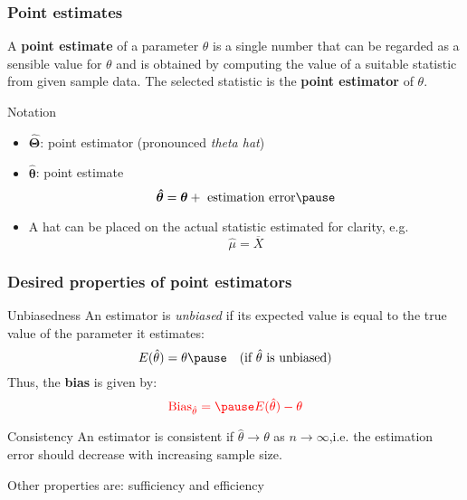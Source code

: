 \documentclass[smaller]{beamer}
\newcommand{\?}{\stackrel{?}{=}}
\newcommand{\ol}{\overline}
\newcommand{\rd}{\color{red}}
\begin{document}
\begin{frame}
  \frametitle{Point estimates}
  \begin{definition}
    A \textbf{point estimate} of a parameter $\theta$ is a single number that can be regarded as a sensible value for
    $\theta$ and is obtained by computing the value of a suitable statistic from given sample data. \pause The selected
    statistic is the \textbf{point estimator} of $\theta$.
  \end{definition}
  \pause
  \begin{block}{Notation}\pause
    \begin{itemize} 
    \item $\bm{\hat\Theta}$: point estimator (pronounced {\it theta hat}) \pause
    \item $\bm{\hat\theta}$: point estimate\pause
      \begin{equation}
        \label{eq:3}
        \bm{\hat\theta}  = \bm\theta + \text{ estimation error}\pause
      \end{equation}
    \item A hat can be placed on the actual statistic estimated for clarity, e.g. \pause
      \begin{equation*}
        \hat{\mu} = \ol{X}
      \end{equation*}
    \end{itemize}
  \end{block}
\end{frame}

\begin{frame}
  \frametitle{Desired properties of point estimators}
  \begin{block}{Unbiasedness}
    An estimator is \textit{unbiased} if its expected value is equal to the true value of the parameter it estimates:\pause
    \begin{equation}
      \label{eq:1}
      E(\hat\theta) = \theta \pause \quad \text{(if $\hat\theta$ is unbiased)}
    \end{equation}
    \pause
    Thus, the \textbf{\rd bias} is given by:\pause
    \begin{equation}
      \label{eq:2}\rd
     \text{Bias}_{\hat\theta} = \pause  E(\hat\theta) - \theta
    \end{equation}
  \end{block}
  \pause

  \begin{block}{Consistency}\pause
    An estimator is consistent if $\hat\theta \to \theta$ as $n\to \infty$,\pause i.e. the estimation error should decrease with increasing sample size.
  \end{block}

  \pause
  Other properties are: sufficiency and efficiency
\end{frame}
\end{document}
